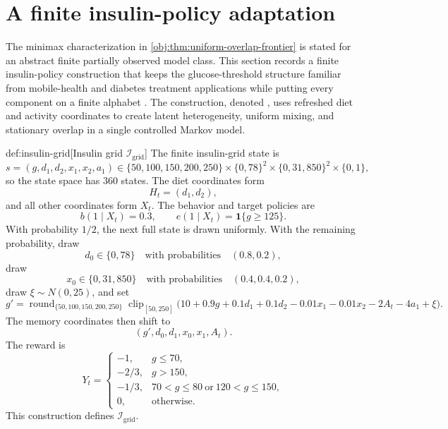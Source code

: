 \documentclass[11pt]{article}
\begin{document}
\section{A finite insulin-policy adaptation}

The minimax characterization in \cref{obj:thm:uniform-overlap-frontier} is stated for an abstract finite partially observed model class. This section records a finite insulin-policy construction that keeps the glucose-threshold structure familiar from mobile-health and diabetes treatment applications while putting every component on a finite alphabet \citep{MaahsEtAl2012,LiaoKlasnjaMurphy2021,LuckettEtAl2020}. The construction, denoted , uses refreshed diet and activity coordinates to create latent heterogeneity, uniform mixing, and stationary overlap in a single controlled Markov model.

\begin{definitionv}{def:insulin-grid}[Insulin grid \(\mathcal I_{\mathrm{grid}}\)]
The finite insulin-grid state is
\[
s=(g,d_1,d_2,x_1,x_2,a_1)
\in
\{50,100,150,200,250\}
\times\{0,78\}^2
\times\{0,31,850\}^2
\times\{0,1\},
\]
so the state space has \(360\) states. The diet coordinates form
\[
H_t=(d_1,d_2),
\]
and all other coordinates form \(X_t\). The behavior and target policies are
\[
b(1\mid X_t)=0.3,
\qquad
e(1\mid X_t)=\mathbf 1\{g\ge 125\}.
\]
With probability \(1/2\), the next full state is drawn uniformly. With the remaining probability, draw
\[
d_0\in\{0,78\}
\quad\text{with probabilities}\quad
(0.8,0.2),
\]
draw
\[
x_0\in\{0,31,850\}
\quad\text{with probabilities}\quad
(0.4,0.4,0.2),
\]
draw \(\xi\sim N(0,25)\), and set
\[
g'
=
\operatorname{round}_{\{50,100,150,200,250\}}
\operatorname{clip}_{[50,250]}
\bigl(
10+0.9g+0.1d_1+0.1d_2-0.01x_1-0.01x_2-2A_t-4a_1+\xi
\bigr).
\]
The memory coordinates then shift to
\[
(g',d_0,d_1,x_0,x_1,A_t).
\]
The reward is
\[
Y_t=
\begin{cases}
-1, & g\le 70,\\
-2/3, & g>150,\\
-1/3, & 70<g\le 80\ \text{or}\ 120<g\le 150,\\
0, & \text{otherwise}.
\end{cases}
\]
This construction defines \(\mathcal I_{\mathrm{grid}}\).
\end{definitionv}
\end{document}

